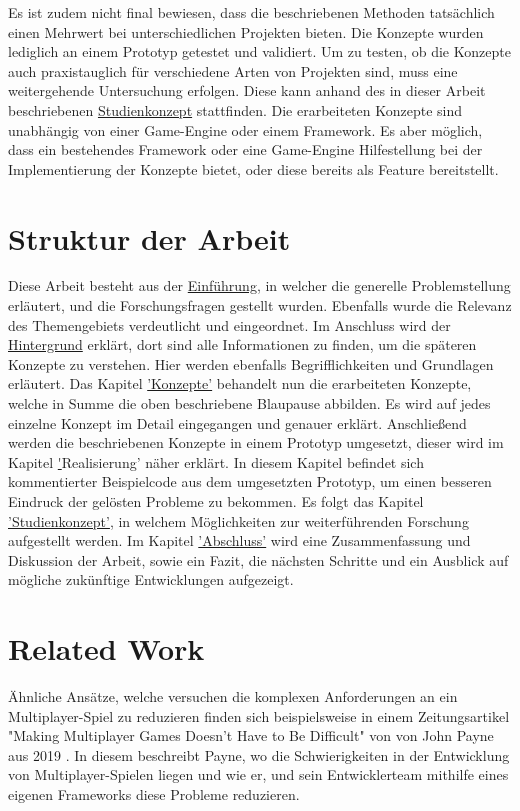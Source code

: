 Es ist zudem nicht final bewiesen, dass die beschriebenen Methoden tatsächlich einen Mehrwert bei unterschiedlichen Projekten bieten. Die Konzepte wurden lediglich an einem Prototyp getestet und validiert. Um zu testen, ob die Konzepte auch praxistauglich für verschiedene Arten von Projekten sind, muss eine weitergehende Untersuchung erfolgen. Diese kann anhand des in dieser Arbeit beschriebenen \hyperref[studienkonzept]{Studienkonzept} stattfinden. Die erarbeiteten Konzepte sind unabhängig von einer Game-Engine oder einem Framework. Es aber möglich, dass ein bestehendes Framework oder eine Game-Engine Hilfestellung bei der Implementierung der Konzepte bietet, oder diese bereits als Feature bereitstellt.

\section{Struktur der Arbeit}

Diese Arbeit besteht aus der \hyperref[sec:einfuehrung]{Einführung}, in welcher die generelle Problemstellung erläutert, und die Forschungsfragen gestellt wurden. Ebenfalls wurde die Relevanz des Themengebiets verdeutlicht und eingeordnet. Im Anschluss wird der \hyperref[sec:hintergrund]{Hintergrund} erklärt, dort sind alle Informationen zu finden, um die späteren Konzepte zu verstehen. Hier werden ebenfalls Begrifflichkeiten und Grundlagen erläutert. Das Kapitel \hyperref[sec:konzepte]{'Konzepte'} behandelt nun die erarbeiteten Konzepte, welche in Summe die oben beschriebene Blaupause abbilden. Es wird auf jedes einzelne Konzept im Detail eingegangen und genauer erklärt. Anschließend werden die beschriebenen Konzepte in einem Prototyp umgesetzt, dieser wird im Kapitel \hyperref[sec:realisierung]'{Realisierung'} näher erklärt. In diesem Kapitel befindet sich kommentierter Beispielcode aus dem umgesetzten Prototyp, um einen besseren Eindruck der gelösten Probleme zu bekommen. Es folgt das Kapitel \hyperref[studienkonzept]{'Studienkonzept'}, in welchem Möglichkeiten zur weiterführenden Forschung aufgestellt werden. Im Kapitel \hyperref[sec:abschluss]{'Abschluss'} wird eine Zusammenfassung und Diskussion der Arbeit, sowie ein Fazit, die nächsten Schritte und ein Ausblick auf mögliche zukünftige Entwicklungen aufgezeigt.

\section{Related Work}

Ähnliche Ansätze, welche versuchen die komplexen Anforderungen an ein Multiplayer-Spiel zu reduzieren finden sich beispielsweise in einem Zeitungsartikel "Making Multiplayer Games Doesn’t Have to Be Difficult" von von John Payne aus 2019  \cite{Payne.18.09.2019}. In diesem beschreibt Payne, wo die Schwierigkeiten in der Entwicklung von Multiplayer-Spielen liegen und wie er, und sein Entwicklerteam mithilfe eines eigenen Frameworks diese Probleme reduzieren.

